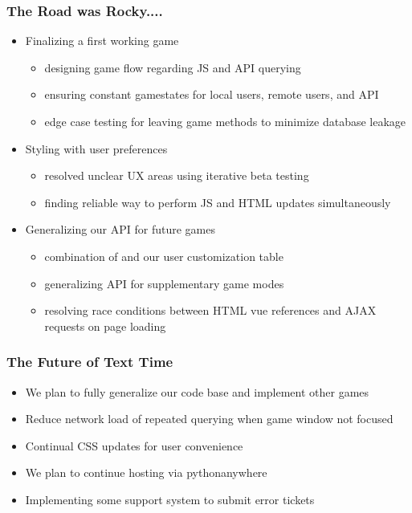 \documentclass[t]{beamer}
\begin{document}
    \begin{frame}
        \frametitle{The Road was Rocky....}
        \begin{itemize}
            \item Finalizing a first working game
            \begin{itemize}
                \item designing game flow regarding JS and API querying
                \item ensuring constant gamestates for local users, remote users, and API
                \item edge case testing for leaving game methods to minimize database leakage
            \end{itemize}
            \item Styling with user preferences
            \begin{itemize}
                \item resolved unclear UX areas using iterative beta testing
                \item finding reliable way to perform JS and HTML updates simultaneously
            \end{itemize}
            \item Generalizing our API for future games
            \begin{itemize}
                \item combination of  and our user customization table
                \item generalizing API for supplementary game modes
                \item resolving race conditions between HTML vue references and AJAX requests on page loading
            \end{itemize}
          \end{itemize}
    \end{frame}

    \begin{frame}
        \frametitle{The Future of Text Time}
        \begin{itemize}
            \item We plan to fully generalize our code base and implement other games
            \item Reduce network load of repeated querying when game window not focused
            \item Continual CSS updates for user convenience
            \item We plan to continue hosting via pythonanywhere
            \item Implementing some support system to submit error tickets
        \end{itemize}
    \end{frame}
\end{document}

